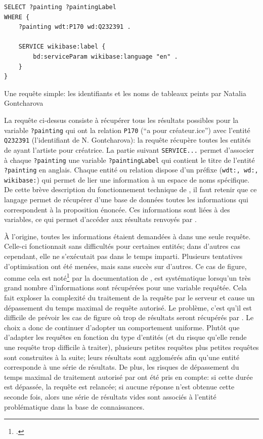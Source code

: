 \begin{listing}[h!]
	\begin{verbatim}
SELECT ?painting ?paintingLabel 
WHERE {
	?painting wdt:P170 wd:Q232391 .
	
	SERVICE wikibase:label {
		bd:serviceParam wikibase:language "en" .
	}
}
	\end{verbatim}
	\caption{Une requête simple: les identifiants et les noms de tableaux peints par Natalia Gontcharova}
	\label{code:sparql}
\end{listing}

La requête ci-dessus consiste à récupérer tous les résultats possibles pour la variable \texttt{?painting} qui ont la relation \texttt{P170} (\enquote{a pour créateur.ice}) avec l'entité \texttt{Q232391} (l'identifiant de N. Gontcharova): la requête récupère toutes les entités de \wkd{} ayant l'artiste pour créatrice. La partie suivant \texttt{SERVICE...} permet d'associer à chaque \texttt{?painting} une variable \texttt{?paintingLabel} qui contient le titre de l'entité \texttt{?painting} en anglais. Chaque entité ou relation dispose d'un préfixe (\texttt{wdt:, wd:, wikibase:}) qui permet de lier une information à un espace de noms spécifique. De cette brève description du fonctionnement technique de \sparql{}, il faut retenir que ce langage permet de récupérer d'une base de données toutes les informations qui correspondent à la proposition énoncée. Ces informations sont liées à des variables, ce qui permet d'accéder aux résultats renvoyés par \sparql{}.

À l'origine, toutes les informations étaient demandées à \sparql{} dans une seule requête. Celle-ci fonctionnait sans difficultés pour certaines entités; dans d'autres cas cependant, elle ne s'exécutait pas dans le temps imparti. Plusieurs tentatives d'optimisation ont été menées, mais sans succès sur d'autres. Ce cas de figure, comme cela est noté\footcite{noauthor_query_2022} par la documentation \sparql{} de \wkd{}, est systématique lorsqu'un très grand nombre d'informations sont récupérées pour une variable requêtée. Cela fait exploser la complexité du traitement de la requête par le serveur et cause un dépassement du temps maximal de requête autorisé. Le problème, c'est qu'il est difficile de prévoir les cas de figure où trop de résultats seront récupérés par \sparql{}. Le choix a donc de continuer d'adopter un comportement uniforme. Plutôt que d'adapter les requêtes en fonction du type d'entités (et du risque qu'elle rende une requête trop difficile à traiter), plusieurs petites requêtes plus petites requêtes sont construites à la suite; leurs résultats sont agglomérés afin qu'une entité corresponde à une série de résultats. De plus, les risques de dépassement du temps maximal de traitement autorisé par \wkd{} ont été pris en compte: si cette durée est dépassée, la requête est relancée; si aucune réponse n'est obtenue cette seconde fois, alors une série de résultats vides sont associés à l'entité problématique dans la base de connaissances.

